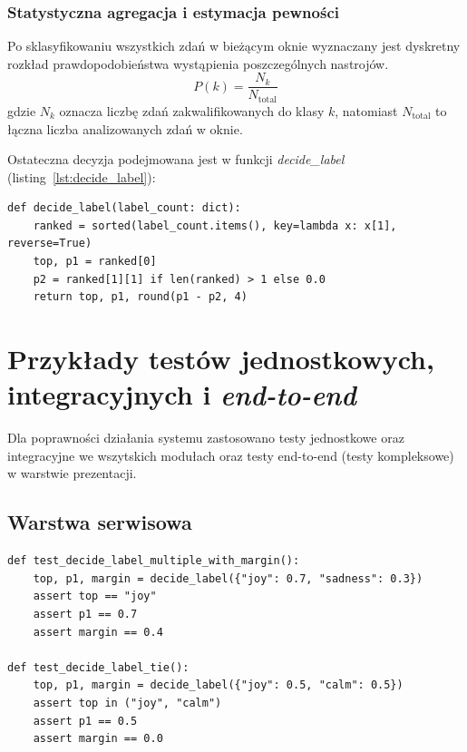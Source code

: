 \subsubsection{Statystyczna agregacja i estymacja pewności}
Po sklasyfikowaniu wszystkich zdań w bieżącym oknie wyznaczany jest dyskretny rozkład 
prawdopodobieństwa wystąpienia poszczególnych nastrojów.
\begin{equation}
    P(k) = \frac{N_k}{N_{\text{total}}}
\end{equation}
gdzie $N_k$ oznacza liczbę zdań zakwalifikowanych do klasy $k$, natomiast $N_{\text{total}}$ to 
łączna liczba analizowanych zdań w oknie.

Ostateczna decyzja podejmowana jest w funkcji \textit{decide\_label} (listing~\ref{lst:decide_label}):
\begin{lstlisting}[style=pythonStyle, label={lst:decide_label}, caption={
    Wyznaczanie wiodącej etykiety, pewności oraz marginesu przewagi
}]
def decide_label(label_count: dict):
    ranked = sorted(label_count.items(), key=lambda x: x[1], reverse=True)
    top, p1 = ranked[0]
    p2 = ranked[1][1] if len(ranked) > 1 else 0.0
    return top, p1, round(p1 - p2, 4)
\end{lstlisting}

\section{Przykłady testów jednostkowych, integracyjnych i \textit{end-to-end}}
Dla poprawności działania systemu zastosowano testy jednostkowe oraz integracyjne we
wszytskich modułach oraz testy end-to-end (testy kompleksowe) w warstwie prezentacji.

\subsection{Warstwa serwisowa}
\begin{lstlisting}[style=pythonStyle, label={lst:backend_unit}, caption={
    Przykład testów jednostkowych w backendzie.
}]
def test_decide_label_multiple_with_margin():
    top, p1, margin = decide_label({"joy": 0.7, "sadness": 0.3})
    assert top == "joy"
    assert p1 == 0.7
    assert margin == 0.4

def test_decide_label_tie():
    top, p1, margin = decide_label({"joy": 0.5, "calm": 0.5})
    assert top in ("joy", "calm")
    assert p1 == 0.5
    assert margin == 0.0
\end{lstlisting}

